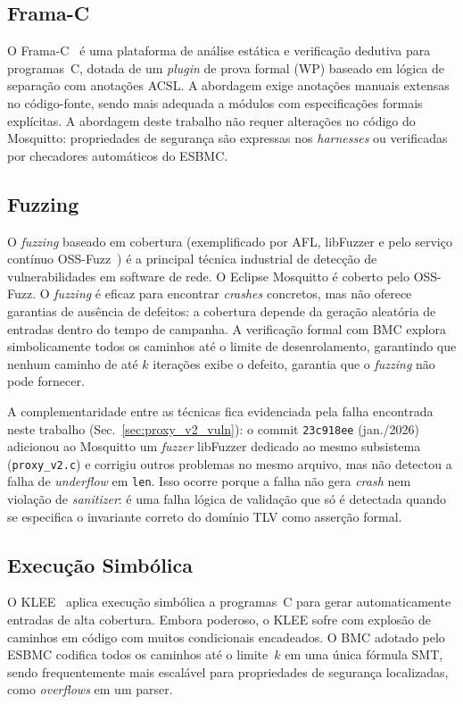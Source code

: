 \documentclass[conference]{IEEEtran}
\begin{document}
\subsection{Frama-C}
O Frama-C~\cite{frama_c} \'e uma plataforma de an\'alise est\'atica e
verifica\c{c}\~ao dedutiva para programas~C, dotada de um \emph{plugin} de prova
formal (WP) baseado em l\'ogica de separa\c{c}\~ao com anota\c{c}\~oes ACSL. A
abordagem exige anota\c{c}\~oes manuais extensas no c\'odigo-fonte, sendo mais
adequada a m\'odulos com especifica\c{c}\~oes formais expl\'icitas. A abordagem deste
trabalho n\~ao requer altera\c{c}\~oes no c\'odigo do Mosquitto: propriedades de
seguran\c{c}a s\~ao expressas nos \emph{harnesses} ou verificadas por checadores
autom\'aticos do ESBMC.

\subsection{Fuzzing}
O \emph{fuzzing} baseado em cobertura (exemplificado por AFL, libFuzzer e pelo
servi\c{c}o cont\'inuo OSS-Fuzz~\cite{ossfuzz}) \'{e} a principal t\'ecnica industrial
de detec\c{c}\~ao de vulnerabilidades em software de rede. O Eclipse Mosquitto \'{e}
coberto pelo OSS-Fuzz. O \emph{fuzzing} \'{e} eficaz para encontrar \emph{crashes}
concretos, mas n\~ao oferece garantias de aus\^encia de defeitos: a cobertura
depende da gera\c{c}\~ao aleat\'oria de entradas dentro do tempo de campanha. A
verifica\c{c}\~ao formal com BMC explora simbolicamente todos os caminhos at\'e o
limite de desenrolamento, garantindo que nenhum caminho de at\'e $k$ itera\c{c}\~oes
exibe o defeito, garantia que o \emph{fuzzing} n\~ao pode fornecer.

A complementaridade entre as t\'ecnicas fica evidenciada pela falha encontrada
neste trabalho (Sec.~\ref{sec:proxy_v2_vuln}): o commit \texttt{23c918ee}
(jan./2026) adicionou ao Mosquitto um \emph{fuzzer} libFuzzer dedicado ao
mesmo subsistema (\texttt{proxy\_v2.c}) e corrigiu outros problemas no mesmo
arquivo, mas n\~ao detectou a falha de \emph{underflow} em \texttt{len}. Isso
ocorre porque a falha n\~ao gera \emph{crash} nem viola\c{c}\~ao de
\emph{sanitizer}: \'e uma falha l\'ogica de valida\c{c}\~ao que s\'o \'e
detectada quando se especifica o invariante correto do dom\'inio TLV como
asser\c{c}\~ao formal.

\subsection{Execu\c{c}\~ao Simb\'olica}
O KLEE~\cite{klee2008} aplica execu\c{c}\~ao simb\'olica a programas~C para gerar
automaticamente entradas de alta cobertura. Embora poderoso, o KLEE sofre com
explos\~ao de caminhos em c\'odigo com muitos condicionais encadeados. O BMC
adotado pelo ESBMC codifica todos os caminhos at\'e o limite~$k$ em uma \'unica
f\'ormula SMT, sendo frequentemente mais escal\'avel para propriedades de seguran\c{c}a
localizadas, como \emph{overflows} em um parser.
\end{document}

